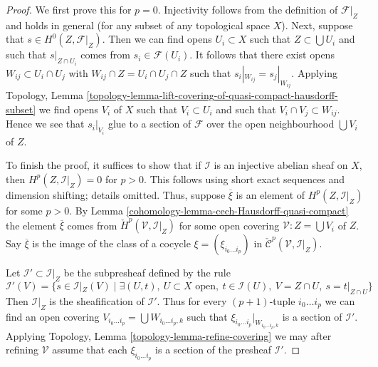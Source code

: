 \begin{proof}

We first prove this for $p = 0$. Injectivity follows from
the definition of $\mathcal{F}|_Z$ and holds in general
(for any subset of any topological space $X$). Next, suppose that
$s \in H^0(Z, \mathcal{F}|_Z)$. Then we can find opens $U_i \subset X$
such that $Z \subset \bigcup U_i$ and such that $s|_{Z \cap U_i}$
comes from $s_i \in \mathcal{F}(U_i)$. It follows that
there exist opens $W_{ij} \subset U_i \cap U_j$ with
$W_{ij} \cap Z = U_i \cap U_j \cap Z$ such that
$s_i|_{W_{ij}} = s_j|_{W_{ij}}$. Applying
Topology, Lemma
\ref{topology-lemma-lift-covering-of-quasi-compact-hausdorff-subset}
we find opens $V_i$ of $X$ such that $V_i \subset U_i$ and
such that $V_i \cap V_j \subset W_{ij}$. Hence we see that
$s_i|_{V_i}$ glue to a section of $\mathcal{F}$ over the
open neighbourhood $\bigcup V_i$ of $Z$.

\medskip\noindent
To finish the proof, it suffices to show that if $\mathcal{I}$ is an
injective abelian sheaf on $X$, then $H^p(Z, \mathcal{I}|_Z) = 0$
for $p > 0$. This follows using short exact sequences and dimension
shifting; details omitted. Thus, suppose $\overline{\xi}$ is an element
of $H^p(Z, \mathcal{I}|_Z)$ for some $p > 0$.
By Lemma \ref{cohomology-lemma-cech-Hausdorff-quasi-compact}
the element $\overline{\xi}$ comes from
$\check{H}^p(\mathcal{V}, \mathcal{I}|_Z)$
for some open covering $\mathcal{V} : Z = \bigcup V_i$ of $Z$.
Say $\overline{\xi}$ is the image of the class of a cocycle
$\xi = (\xi_{i_0 \ldots i_p})$ in
$\check{\mathcal{C}}^p(\mathcal{V}, \mathcal{I}|_Z)$.

\medskip\noindent
Let $\mathcal{I}' \subset \mathcal{I}|_Z$ be the subpresheaf
defined by the rule
$$
\mathcal{I}'(V) =
\{s \in \mathcal{I}|_Z(V) \mid
\exists (U, t),\ U \subset X\text{ open},
\ t \in \mathcal{I}(U),\ V = Z \cap U,\ s = t|_{Z \cap U} \}
$$
Then $\mathcal{I}|_Z$ is the sheafification of $\mathcal{I}'$.
Thus for every $(p + 1)$-tuple $i_0 \ldots i_p$ we can find an
open covering $V_{i_0 \ldots i_p} = \bigcup W_{i_0 \ldots i_p, k}$
such that $\xi_{i_0 \ldots i_p}|_{W_{i_0 \ldots i_p, k}}$ is
a section of $\mathcal{I}'$. Applying
Topology, Lemma \ref{topology-lemma-refine-covering}
we may after refining $\mathcal{V}$ assume that each
$\xi_{i_0 \ldots i_p}$ is a section of the presheaf $\mathcal{I}'$.


\end{proof}
